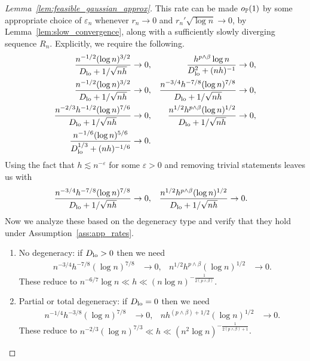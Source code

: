 \begin{proof}[Lemma~\ref{lem:feasible_gaussian_approx}]

  This rate can be made $o_\P(1)$
  by some appropriate choice of $\varepsilon_n$
  whenever
  $r_n \to 0$
  and
  $r_n' \sqrt{\log n} \to 0$,
  by Lemma~\ref{lem:slow_convergence}, along with
  a sufficiently slowly diverging sequence $R_n$.
  Explicitly, we require the following.
  \begin{align*}
    \frac{n^{-1/2} (\log n)^{3/2}}{\Dl + 1/\sqrt{nh}}
    &\to 0,
    &\frac{h^{p \wedge \beta} \log n}{\Dl^2 + (nh)^{-1}}
    &\to 0, \\
    \frac{n^{-1/2} (\log n)^{3/2}}
    {\Dl + 1/\sqrt{nh}}
    &\to 0,
    &\frac{n^{-3/4} h^{-7/8} (\log n)^{7/8}}
    {\Dl + 1/\sqrt{nh}}
    &\to 0, \\
    \frac{n^{-2/3} h^{-1/2} (\log n)^{7/6}}
    {\Dl + 1/\sqrt{nh}}
    &\to 0,
    &\frac{n^{1/2} h^{p \wedge \beta} (\log n)^{1/2}}
    {\Dl + 1/\sqrt{nh}}
    &\to 0, \\
    \frac{n^{-1/6}(\log n)^{5/6}}
    {\Dl^{1/3} + (nh)^{-1/6}}
    &\to 0.
  \end{align*}
  Using the fact that $h \lesssim n^{-\varepsilon}$
  for some $\varepsilon > 0$
  and removing trivial statements leaves us with
  \begin{align*}
    \frac{n^{-3/4} h^{-7/8} (\log n)^{7/8}}
    {\Dl + 1/\sqrt{nh}}
    &\to 0,
    &\frac{n^{1/2} h^{p \wedge \beta} (\log n)^{1/2}}
    {\Dl + 1/\sqrt{nh}}
    &\to 0.
  \end{align*}
  Now we analyze these based on the degeneracy type
  and verify that they hold under
  Assumption~\ref{ass:app_rates}.
  \begin{enumerate}[label=(\roman*)]

    \item No degeneracy:
      if $\Dl > 0$ then we need
      \begin{align*}
        n^{-3/4} h^{-7/8} (\log n)^{7/8}
        &\to 0,
        &n^{1/2} h^{p \wedge \beta} (\log n)^{1/2}
        &\to 0.
      \end{align*}
      These reduce to
      $n^{-6/7} \log n \ll h
      \ll (n \log n)^{-\frac{1}{2(p \wedge \beta)}}$.

    \item Partial or total degeneracy:
      if $\Dl = 0$ then we need
      \begin{align*}
        n^{-1/4} h^{-3/8} (\log n)^{7/8}
        &\to 0,
        &n h^{(p \wedge \beta) + 1/2} (\log n)^{1/2}
        &\to 0.
      \end{align*}
      These reduce to
      $n^{-2/3} (\log n)^{7/3} \ll h
      \ll (n^2 \log n)^{-\frac{1}{2(p \wedge \beta) + 1}}$.

  \end{enumerate}
\end{proof}

